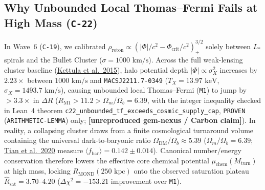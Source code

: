 \documentclass[11pt,a4paper]{article}
\newcommand{\unrepro}{\textbf{\textcolor{red!60!black}{[unreproduced gem-nexus / Carbon claim]}}}
\begin{document}
\subsection{Why Unbounded Local Thomas--Fermi Fails at High Mass (\texttt{C-22})}
In Wave~6 (\texttt{C-19}), we calibrated $\rho_{\mathrm{roton}} \propto (|\Phi|/c^2 - \Phi_{\mathrm{crit}}/c^2)_+^{3/2}$ solely between $L_*$ spirals and the Bullet Cluster ($\sigma = 1000\text{ km/s}$). Across the full weak-lensing cluster baseline (\href{https://arxiv.org/html/1410.8769v2}{Kettula et al.\ 2015}), halo potential depth $|\Phi| \propto \sigma_X^2$ increases by $2.23\times$ between $1000\text{ km/s}$ and \texttt{MACSJ2211.7-0349} ($T_X = 13.97\text{ keV}$, $\sigma_X = 1493.7\text{ km/s}$), causing unbounded local Thomas--Fermi (\texttt{M1}) to jump by $>3.3\times$ in $\Delta R$ ($R_{\mathrm{M1}} > 11.2 > \Omega_m/\Omega_b = 6.39$, with the integer inequality checked in Lean~4 theorem \texttt{c22\_unbounded\_tf\_exceeds\_cosmic\_supply\_cap}, \texttt{PROVEN} (\texttt{ARITHMETIC-LEMMA}) only; \unrepro). In reality, a collapsing cluster draws from a finite cosmological turnaround volume containing the universal dark-to-baryonic ratio $\Omega_{\mathrm{DM}}/\Omega_b \approx 5.39$ ($\Omega_m/\Omega_b = 6.39$; \href{https://arxiv.org/html/2001.08340v2}{Tian et al.\ 2020} measure $\langle f_{\mathrm{bar}}\rangle = 0.142 \pm 0.014$). Canonical number/energy conservation therefore lowers the effective core chemical potential $\mu_{\mathrm{chem}}(M_{\mathrm{turn}})$ at high mass, locking $R_{\mathrm{MOND}}(250\text{ kpc})$ onto the observed saturation plateau $\hat{R}_{\mathrm{sat}} = 3.70\text{--}4.20$ ($\Delta\chi^2 = -153.21$ improvement over \texttt{M1}).
\end{document}
